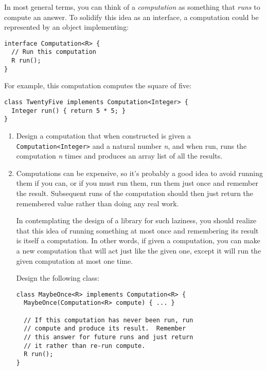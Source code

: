 \documentclass[12pt]{article}                   %
\def\pts#1{\marginpar{\footnotesize \raggedright  \fbox{#1 {\sc Points}}}}
\begin{document}
\begin{problem} \pts{18}

In most general terms, you can think of a \emph{computation} as something that
\emph{runs} to compute an answer.  To solidify this idea as an interface, a
computation could be represented by an object implementing:

\begin{verbatim}
interface Computation<R> {
  // Run this computation
  R run();
}
\end{verbatim}

\noindent
For example, this computation computes the square of five:

\begin{verbatim}
class TwentyFive implements Computation<Integer> {
  Integer run() { return 5 * 5; }
}
\end{verbatim}

\begin{enumerate}

\item Design a computation that when constructed is given a
 \texttt{Computation<Integer>} and a natural number \emph{n}, and when
 run, runs the computation \emph{n} times and produces an array list
of all the results.

\newpage
\item

Computations can be expensive, so it's probably a good idea to avoid
 running them if you can, or if you must run them, run them just once
 and remember the result. Subsequent runs of the computation should
 then just return the remembered value rather than doing any real
 work.

In contemplating the design of a library for such laziness, you should
 realize that this idea of running something at most once and
 remembering its result is itself a computation.  In other words, if
 given a computation, you can make a new computation that will act
 just like the given one, except it will run the given computation at
 most one time.

Design the following class:

\begin{verbatim}
class MaybeOnce<R> implements Computation<R> {
  MaybeOnce(Computation<R> compute) { ... }

  // If this computation has never been run, run
  // compute and produce its result.  Remember
  // this answer for future runs and just return
  // it rather than re-run compute.
  R run();
}
\end{verbatim}
\end{enumerate}


\end{problem}
\end{document}

